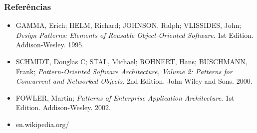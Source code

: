 \documentclass{beamer}
\begin{document}
\begin{frame}
\frametitle{Referências}
\begin{itemize}
	\item GAMMA, Erich; HELM, Richard; JOHNSON, Ralph; VLISSIDES, John; \textit{Design Patterns: Elements of Reusable Object-Oriented Software}. 1st Edition. Addison-Wesley. 1995.
	\item SCHMIDT, Douglas C; STAL, Michael; ROHNERT, Hans; BUSCHMANN, Frank; \textit{Pattern-Oriented Software Architecture, Volume 2: Patterns for Concurrent and Networked Objects}. 2nd Edition. John Wiley and Sons. 2000.
	\item FOWLER, Martin; \textit{Patterns of Enterprise Application Architecture}. 1st Edition. Addison-Wesley. 2002.
	\item en.wikipedia.org/
\end{itemize}
\end{frame}
\end{document}

